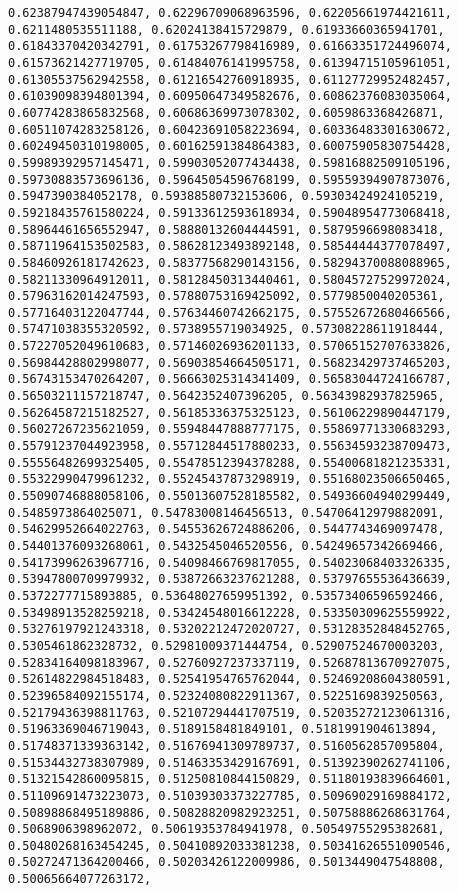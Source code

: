 \documentclass[11pt]{article}
\begin{document}
\begin{Verbatim}[commandchars=\\\{\}]
0.62387947439054847, 0.62296709068963596, 0.62205661974421611, 0.6211480535511188, 0.62024138415729879, 0.61933660365941701, 0.61843370420342791, 0.61753267798416989, 0.61663351724496074, 0.61573621427719705, 0.61484076141995758, 0.61394715105961051, 0.61305537562942558, 0.61216542760918935, 0.61127729952482457, 0.61039098394801394, 0.60950647349582676, 0.60862376083035064, 0.60774283865832568, 0.60686369973078302, 0.6059863368426871, 0.60511074283258126, 0.60423691058223694, 0.60336483301630672, 0.60249450310198005, 0.60162591384864383, 0.60075905830754428, 0.59989392957145471, 0.59903052077434438, 0.59816882509105196, 0.59730883573696136, 0.59645054596768199, 0.59559394907873076, 0.5947390384052178, 0.59388580732153606, 0.59303424924105219, 0.59218435761580224, 0.59133612593618934, 0.59048954773068418, 0.58964461656552947, 0.58880132604444591, 0.5879596698083418, 0.58711964153502583, 0.58628123493892148, 0.58544444377078497, 0.58460926181742623, 0.58377568290143156, 0.58294370088088965, 0.58211330964912011, 0.58128450313440461, 0.58045727529972024, 0.57963162014247593, 0.57880753169425092, 0.5779850040205361, 0.57716403122047744, 0.57634460742662175, 0.57552672680466566, 0.57471038355320592, 0.5738955719034925, 0.57308228611918444, 0.57227052049610683, 0.57146026936201133, 0.57065152707633826, 0.56984428802998077, 0.56903854664505171, 0.56823429737465203, 0.56743153470264207, 0.56663025314341409, 0.56583044724166787, 0.56503211157218747, 0.5642352407396205, 0.56343982937825965, 0.56264587215182527, 0.56185336375325123, 0.56106229890447179, 0.56027267235621059, 0.55948447888777175, 0.55869771330683293, 0.55791237044923958, 0.55712844517880233, 0.55634593238709473, 0.55556482699325405, 0.55478512394378288, 0.55400681821235331, 0.55322990479961232, 0.55245437873298919, 0.55168023506650465, 0.55090746888058106, 0.55013607528185582, 0.54936604940299449, 0.5485973864025071, 0.54783008146456513, 0.54706412979882091, 0.54629952664022763, 0.54553626724886206, 0.5447743469097478, 0.54401376093268061, 0.5432545046520556, 0.54249657342669466, 0.54173996263967716, 0.54098466769817055, 0.54023068403326335, 0.53947800709979932, 0.53872663237621288, 0.53797655536436639, 0.5372277715893885, 0.53648027659951392, 0.53573406596592466, 0.53498913528259218, 0.53424548016612228, 0.53350309625559922, 0.53276197921243318, 0.53202212472020727, 0.53128352848452765, 0.5305461862328732, 0.52981009371444754, 0.52907524670003203, 0.52834164098183967, 0.52760927237337119, 0.52687813670927075, 0.52614822984518483, 0.52541954765762044, 0.52469208604380591, 0.52396584092155174, 0.52324080822911367, 0.5225169839250563, 0.52179436398811763, 0.52107294441707519, 0.52035272123061316, 0.51963369046719043, 0.5189158481849101, 0.5181991904613894, 0.51748371339363142, 0.51676941309789737, 0.5160562857095804, 0.51534432738307989, 0.51463353429167691, 0.51392390262741106, 0.51321542860095815, 0.51250810844150829, 0.51180193839664601, 0.51109691473223073, 0.51039303373227785, 0.50969029169884172, 0.50898868495189886, 0.50828820982923251, 0.50758886268631764, 0.5068906398962072, 0.50619353784941978, 0.50549755295382681, 0.50480268163454245, 0.50410892033381238, 0.50341626551090546, 0.50272471364200466, 0.50203426122009986, 0.5013449047548808, 0.50065664077263172, 
\end{Verbatim}
\end{document}
